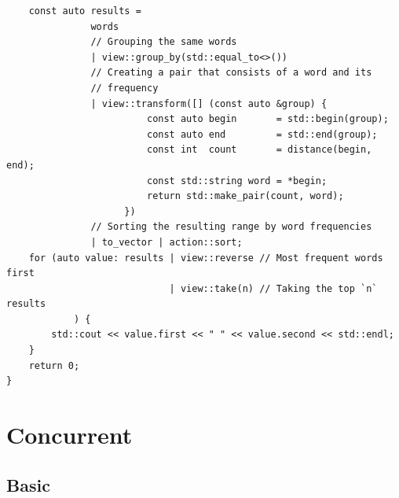 \documentclass[a4paper,11pt,twoside]{book}
\begin{document}
\begin{itemize}
\begin{lstlisting}
    const auto results =
               words
               // Grouping the same words
               | view::group_by(std::equal_to<>())
               // Creating a pair that consists of a word and its
               // frequency
               | view::transform([] (const auto &group) {
                         const auto begin       = std::begin(group);
                         const auto end         = std::end(group);
                         const int  count       = distance(begin, end);
                         const std::string word = *begin;
                         return std::make_pair(count, word);
                     })
               // Sorting the resulting range by word frequencies
               | to_vector | action::sort;
    for (auto value: results | view::reverse // Most frequent words first
                             | view::take(n) // Taking the top `n` results
            ) {
        std::cout << value.first << " " << value.second << std::endl;
    }
    return 0;
}
\end{lstlisting}
\end{itemize}


\chapter{Concurrent}
\section{Basic}
\end{document}
